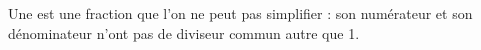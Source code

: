 Une  est une fraction que l'on ne peut pas simplifier :
son numérateur et son dénominateur n'ont pas de diviseur commun autre que 1.